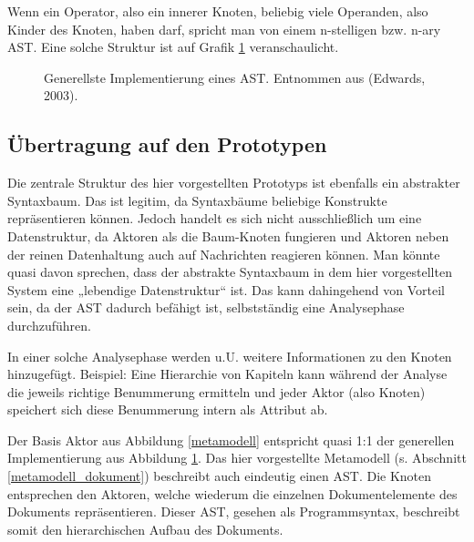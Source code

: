 Wenn ein Operator, also ein innerer Knoten, beliebig viele Operanden, also Kinder des Knoten, haben darf, spricht man von einem n-stelligen bzw. n-ary AST. \citep{Edwards} Eine solche Struktur ist auf Grafik \ref{astimpl} veranschaulicht.

 
\begin{figure}[h!]
\centering
\advance\leftskip-2.5cm
\caption{ Generellste Implementierung eines AST. Entnommen aus (Edwards, 2003). }\label{astimpl}
\end{figure}
 
\subsection{Übertragung auf den Prototypen}\label{}
 
Die zentrale Struktur des hier vorgestellten Prototyps ist ebenfalls ein abstrakter Syntaxbaum. Das ist legitim, da Syntaxbäume beliebige Konstrukte repräsentieren können. Jedoch handelt es sich nicht ausschließlich um eine Datenstruktur, da Aktoren als die Baum-Knoten fungieren und Aktoren neben der reinen Datenhaltung auch auf Nachrichten reagieren können. Man könnte quasi davon sprechen, dass der abstrakte Syntaxbaum in dem hier vorgestellten System eine „lebendige Datenstruktur“ ist. Das kann dahingehend von Vorteil sein, da der AST dadurch befähigt ist, selbstständig eine Analysephase durchzuführen.

 
In einer solche Analysephase werden u.U. weitere Informationen zu den Knoten hinzugefügt. Beispiel: Eine Hierarchie von Kapiteln kann während der Analyse die jeweils richtige Benummerung ermitteln und jeder Aktor (also Knoten) speichert sich diese Benummerung intern als Attribut ab.

 
Der Basis Aktor aus Abbildung \ref{metamodell} entspricht quasi 1:1 der generellen Implementierung aus Abbildung \ref{astimpl}. Das hier vorgestellte Metamodell (s. Abschnitt \ref{metamodell_dokument}) beschreibt auch eindeutig einen AST. Die Knoten entsprechen den Aktoren, welche wiederum die einzelnen Dokumentelemente des Dokuments repräsentieren. Dieser AST, gesehen als Programmsyntax, beschreibt somit den hierarchischen Aufbau des Dokuments.

